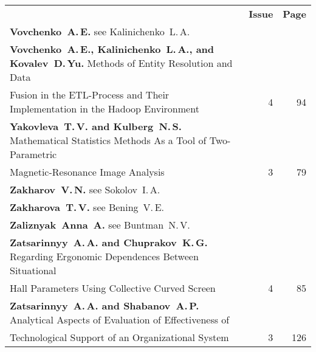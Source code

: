 \def\leftfootline{\small{\textbf{\thepage}
\hfill INFORMATIKA I EE PRIMENENIYA~--- INFORMATICS AND APPLICATIONS\ \ \ 2014\
\ \ volume~8\ \ \ issue\ 4}
}%
 \def\rightfootline{\small{INFORMATIKA I EE PRIMENENIYA~---
INFORMATICS AND APPLICATIONS\ \ \ 2014\ \ \ volume~8\ \ \ issue\ 4
\hfill \textbf{\thepage}}}

\def\leftkol{2014 AUTHOR INDEX} %

\def\rightkol{2014 AUTHOR INDEX} %


{\tabcolsep=3pt
\begin{tabular}{p{397pt}rr}
&\textbf{Issue} & \textbf{Page}\\[6pt]
\textbf{Vovchenko~A.\,E.} see Kalinichenko~L.\,A.&&\\
\textbf{Vovchenko~A.\,E., Kalinichenko~L.\,A., and Kovalev~D.\,Yu.} Methods of Entity
Resolution and Data\linebreak
\vspace*{-12pt}\\
\hspace*{23pt}Fusion in the ETL-Process and Their Implementation in the Hadoop
Environment\dotfill&4&94\\
\textbf{Yakovleva~T.\,V. and Kulberg~N.\,S.} Mathematical Statistics Methods As a Tool of
Two-Parametric\linebreak
\vspace*{-12pt}\\
\hspace*{23pt}Magnetic-Resonance Image Analysis\dotfill&3&79\\
\textbf{Zakharov~V.\,N.} see Sokolov~I.\,A.&&\\
\textbf{Zakharova~T.\,V.} see Bening~V.\,E.&&\\
\textbf{Zaliznyak~Anna~A.} see Buntman~N.\,V.&&\\
\textbf{Zatsarinnyy~A.\,A. and Chuprakov~K.\,G.} Regarding Ergonomic Dependences
Between Situational\linebreak
\vspace*{-12pt}\\
\hspace*{23pt}Hall Parameters Using Collective Curved Screen\dotfill&4&85\\
\textbf{Zatsarinnyy~A.\,A. and Shabanov~A.\,P.} Analytical Aspects of Evaluation of
Effectiveness of\linebreak
\vspace*{-12pt}\\
\hspace*{23pt}Technological Support of an Organizational System\dotfill&3&126\\

\end{tabular}}
